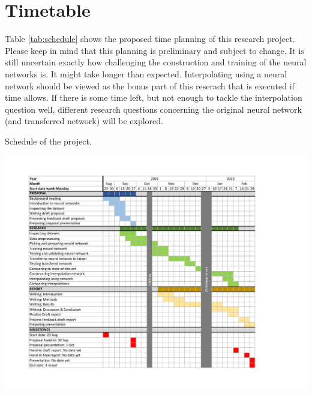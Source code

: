 \documentclass[twocolumn, 10pt, a4paper]{article}
\begin{document}
	
	\section{Timetable}
	
	Table \ref{tab:schedule} shows the proposed time planning of this research project. Please keep in mind that this planning is preliminary and subject to change. It is still uncertain exactly how challenging the construction and training of the neural networks is. It might take longer than expected. Interpolating using a neural network should be viewed as the bonus part of this reserach that is executed if time allows. If there is some time left, but not enough to tackle the interpolation question well, different research questions concerning the original neural network (and transferred network) will be explored.
	
	
	\begin{table}[t]
		\caption{Schedule of the project.}
		\label{tab:schedule}
		\includegraphics[width=2.1\columnwidth, clip=true]{images/Proposal Schedule.pdf}
	\end{table}
	
	
	
	
	
	
	
	
	
	
	
	
	
\end{document}

